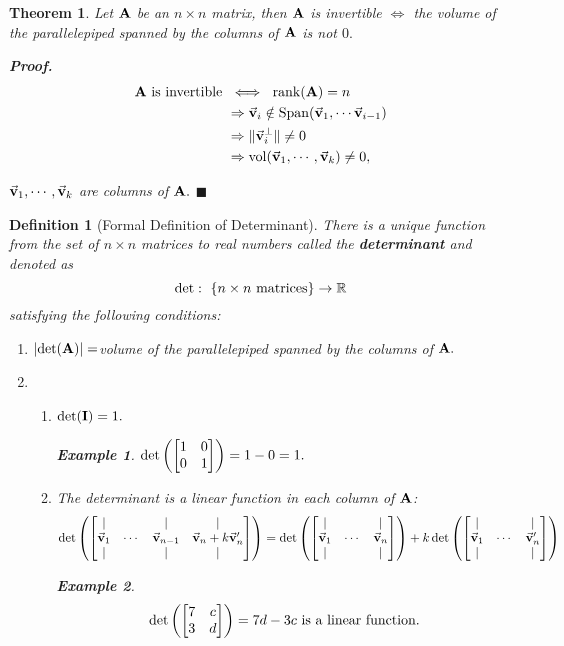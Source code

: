 \documentclass[12pt, a4paper]{article}
\newtheorem{thm}{Theorem}[subsection]
\newtheorem{df}{Definition}[subsection]
\newtheorem{eg}{Example}[subsection]
\newenvironment*{prf}{\par\indent\textbf{\textit{Proof. }}}{\hfill $\blacksquare$\par}
\def\R{{\mathbb{R}}}
\def\Span{\mathrm{Span}}
\def\rank{\mathrm{rank}}
\def\vol{\mathrm{vol}}
\def\vecv{\va{v}}
\def\matrixA{\vb{A}}
\def\matrixI{\vb{I}}
\begin{document}
\begin{thm}
	Let $\matrixA$ be an $n\times n$ matrix, then $\matrixA$ is invertible $\iff$ the volume of the parallelepiped spanned by the columns of $\matrixA$ is not $0.$
	\begin{prf}
		\[\begin{aligned}\matrixA\text{ is invertible }&\iff\ \rank(\matrixA)=n\\&\Rightarrow\vecv_i\notin\Span(\vecv_1,\cdots\vecv_{i-1})\\&\Rightarrow\|\vecv_i^\perp\|\neq0\\&\Rightarrow\vol\qty(\vecv_1,\cdots,\vecv_k)\neq0,		
		\end{aligned}\]\par $\vecv_1,\cdots,\vecv_k$ are columns of $\matrixA.$
	\end{prf}
\end{thm}
\begin{df}[Formal Definition of Determinant]
	There is a unique function from the set of $n\times n$ matrices to real numbers called the \textbf{determinant} and denoted as \[\det:\ \qty{n\times n\text{ matrices}}\to\R\] satisfying the following conditions: 
	\begin{enumerate}
		\item $\qty|\det(\matrixA)|=$volume of the parallelepiped spanned by the columns of $\matrixA.$
		\item 
		\begin{enumerate}
			\item $\det(\matrixI)=1.$
			\begin{eg}$\det\qty(\mqty[{1&0\\0&1}])=1\time1-0=1.$\end{eg}
			\item The determinant is a linear function in each column of $\matrixA$: \[\det\qty(\mqty[{|&&|&|\\\vecv_1&\cdots&\vecv_{n-1}&\vecv_n+k\vecv_n'\\|&&|&|}])=\det\qty(\mqty[{|&&|\\\vecv_1&\cdots&\vecv_n\\|&&|}])+k\det\qty(\mqty[|&&|\\\vecv_1&\cdots&\vecv_n'\\|&&|])\]
			\begin{eg}\[\det\qty(\mqty[{7&c\\3&d}])=7d-3c\text{ is a linear function}.\]\end{eg}
		\end{enumerate}
	\end{enumerate}
\end{df}
\end{document}
